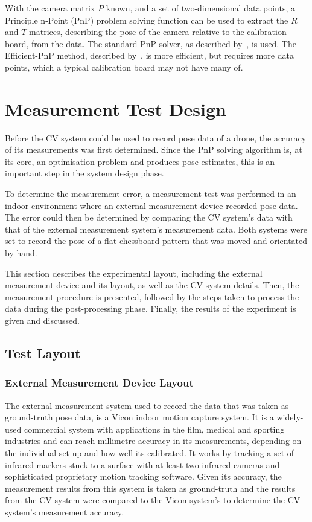 With the camera matrix $P$ known, and a set of two-dimensional data points, a Principle n-Point (PnP) problem solving function can be used to extract the $R$ and $T$ matrices, describing the pose of the camera relative to the calibration board, from the data. The standard PnP solver, as described by~\cite{Schweighofer2006}, is used. The Efficient-PnP method, described by~\cite{Lepetit2008}, is more efficient, but requires more data points, which a typical calibration board may not have many of.

\section{Measurement Test Design}

Before the CV system could be used to record pose data of a drone, the accuracy of its measurements was first determined. Since the PnP solving algorithm is, at its core, an optimisation problem and produces pose estimates, this is an important step in the system design phase. 

To determine the measurement error, a measurement test was performed in an indoor environment where an external measurement device recorded pose data. The error could then be determined by comparing the CV system's data with that of the external measurement system's measurement data. Both systems were set to record the pose of a flat chessboard pattern that was moved and orientated by hand.

This section describes the experimental layout, including the external measurement device and its layout, as well as the CV system details. Then, the measurement procedure is presented, followed by the steps taken to process the data during the post-processing phase. Finally, the results of the experiment is given and discussed. 

\subsection{Test Layout}
\label{sec:vicon-test-setup}

\subsubsection{External Measurement Device Layout}

The external measurement system used to record the data that was taken as ground-truth pose data, is a Vicon indoor motion capture system. It is a widely-used commercial system with applications in the film, medical and sporting industries and can reach millimetre accuracy in its measurements, depending on the individual set-up and how well its calibrated. It works by tracking a set of infrared markers stuck to a surface with at least two infrared cameras and sophisticated proprietary motion tracking software. Given its accuracy, the measurement results from this system is taken as ground-truth and the results from the CV system were compared to the Vicon system's to determine the CV system's measurement accuracy. 

